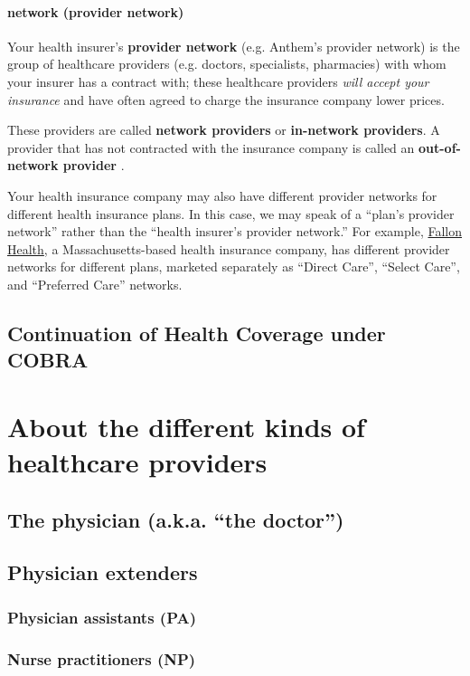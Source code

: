 \documentclass{article}
\begin{document}
\paragraph{network (provider network)} Your health insurer's {\bf provider network} (e.g. Anthem's provider network) is the group of healthcare providers (e.g. doctors, specialists, pharmacies) with whom your insurer has a contract with; these healthcare providers {\it will accept your insurance} and have often agreed to charge the insurance company lower prices.

These providers are called {\bf network providers} or {\bf in-network providers}. A provider that has not contracted with the insurance company is called an {\bf out-of-network provider} \cite{provider-networks}.

Your health insurance company may also have different provider networks for different health insurance plans. In this case, we may speak of a ``plan's provider network'' rather than the ``health insurer's provider network.'' For example, \href{https://www.fchp.org/}{Fallon Health}, a Massachusetts-based health insurance company, has different provider networks for different plans, marketed separately as ``Direct Care'', ``Select Care'', and ``Preferred Care'' networks.

\subsection{Continuation of Health Coverage under COBRA}

\section{About the different kinds of healthcare providers}

\subsection{The physician (a.k.a. ``the doctor'')}

\subsection{Physician extenders}

\subsubsection{Physician assistants (PA)}

\subsubsection{Nurse practitioners (NP)}
\end{document}
